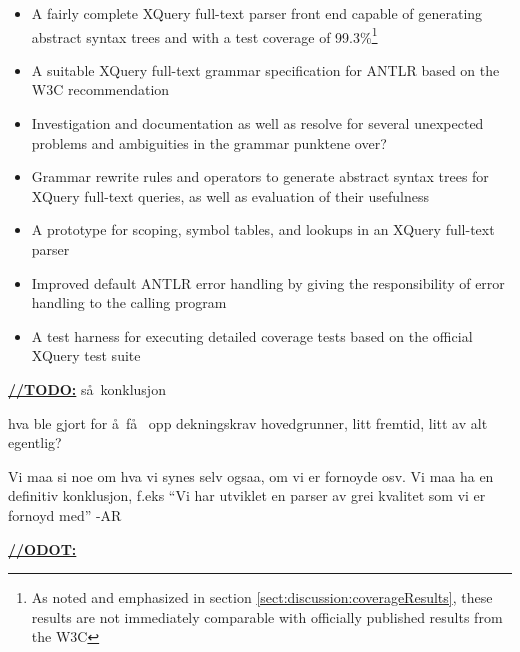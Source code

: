 \begin{itemize}
  \item A fairly complete XQuery full-text parser front end capable of
  generating abstract syntax trees and with a test coverage of
  99.3\%\footnote{As noted and emphasized in section
  \ref{sect:discussion:coverageResults},
  these results are not immediately comparable with officially published results
  from the W3C}


  \item A suitable XQuery full-text grammar specification for ANTLR based on the
  W3C recommendation
  \item Investigation and documentation as well as resolve for several unexpected
  problems and ambiguities in the grammar
  punktene over?
  \item Grammar rewrite rules and operators to generate abstract
  syntax trees for XQuery full-text queries, as well as evaluation of their
  usefulness
  \item A prototype for scoping, symbol tables, and lookups in an XQuery
  full-text parser
  \item Improved default ANTLR error handling by giving the responsibility
  of error handling to the calling program
  \item A test harness for executing detailed coverage tests based on the
  official XQuery test suite
\end{itemize}


\underline{\textbf{\LARGE //TODO:}}
s\aa~konklusjon


hva ble gjort for \aa ~f\aa~ opp dekningskrav hovedgrunner, litt fremtid, litt
av alt egentlig? 

Vi maa si noe om hva vi synes selv ogsaa, om vi er fornoyde osv. Vi maa ha en
definitiv konklusjon, f.eks ``Vi har utviklet en parser av grei kvalitet som vi
er fornoyd med'' 
-AR

\underline{\textbf{\LARGE //ODOT:}}